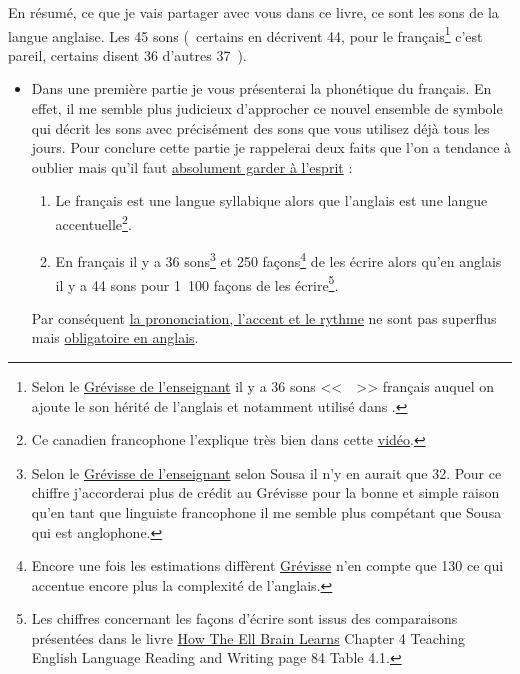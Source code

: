 En résumé, ce que je vais partager avec vous dans ce livre, ce
sont les sons de la langue anglaise. Les 45 sons (~certains en
décrivent 44, pour le français\footnote{Selon le
  \href{https://www.amazon.fr/gp/product/221010632X/ref=as_li_tl?ie=UTF8&camp=1642&creative=6746&creativeASIN=221010632X&linkCode=as2&tag=wwwbecomefree-21&linkId=c8c522ee07ffc9188dd9a768e39d88e0}{Grévisse
  de l'enseignant} il y a 36 sons <<~~>> français
auquel on ajoute le son  hérité de l'anglais et notamment utilisé dans .} c'est pareil, certains disent 36
d'autres 37~).\par
\begin{itemize}
\item Dans une première partie je vous présenterai la phonétique du
français. En effet, il me semble plus judicieux d'approcher ce nouvel
ensemble de symbole qui décrit les sons avec précisément des sons que
vous utilisez déjà tous les jours.  Pour conclure cette partie je
rappelerai deux faits que l'on a tendance à oublier mais qu'il faut \underline{absolument garder à l'esprit} :
\begin{enumerate}
\item Le français est une langue syllabique alors que l'anglais est
  une langue accentuelle\footnote{Ce canadien francophone l'explique
    très bien dans cette
    \href{https://youtu.be/EjVHGsRCf8M?t=4m45s}{vidéo}.}.
\item En français il y a 36 sons\footnote{Selon le
  \href{https://www.amazon.fr/gp/product/221010632X/ref=as_li_tl?ie=UTF8&camp=1642&creative=6746&creativeASIN=221010632X&linkCode=as2&tag=wwwbecomefree-21&linkId=c8c522ee07ffc9188dd9a768e39d88e0}{Grévisse
  de l'enseignant} selon Sousa il n'y en aurait que 32. Pour ce
chiffre j'accorderai plus de crédit au Grévisse pour la bonne et
simple raison qu'en tant que linguiste francophone il me semble plus
compétant que Sousa qui est anglophone.} et 250 façons\footnote{Encore une
fois les estimations diffèrent
\href{https://www.amazon.fr/gp/product/221010632X/ref=as_li_tl?ie=UTF8&camp=1642&creative=6746&creativeASIN=221010632X&linkCode=as2&tag=wwwbecomefree-21&linkId=c8c522ee07ffc9188dd9a768e39d88e0}{Grévisse}
n'en compte que 130 ce qui accentue encore plus la complexité de l'anglais.} de les écrire alors
  qu'en anglais il y a 44 sons pour 1~100 façons de les
  écrire\footnote{Les chiffres concernant les façons d'écrire sont
    issus des comparaisons présentées dans le livre
    \href{https://www.amazon.fr/gp/product/B00M0GDXN8/ref=as_li_tl?ie=UTF8&camp=1642&creative=6746&creativeASIN=B00M0GDXN8&linkCode=as2&tag=wwwbecomefree-21&linkId=e782cf430858413ec9135fcef1644b20}{How
      The Ell Brain Learns} Chapter 4 Teaching English Language
    Reading and Writing page 84 Table 4.1.}.
\end{enumerate}
Par conséquent \underline{la prononciation, l'accent et le rythme} ne sont pas
superflus mais \underline{obligatoire en anglais}.\par


\end{itemize}
